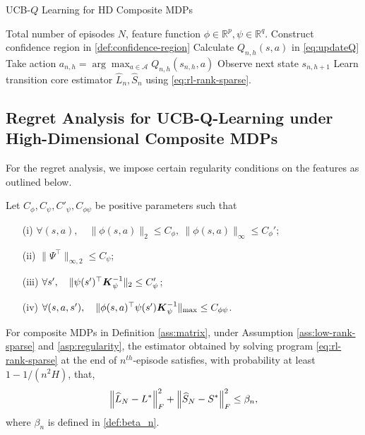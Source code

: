 \begin{algorithm}[tb]
\caption{UCB-$Q$ Learning for HD Composite MDPs}
\label{alg:UCBQL}
\begin{algorithmic}
 Total number of episodes $N$, feature function $\phi\in \mathbb{R}^p, \psi\in \mathbb{R}^q$.
\STATE Construct confidence region in \eqref{def:confidence-region} \STATE Calculate $Q_{n, h}(s, a)$ in \eqref{eq:updateQ}
\STATE Take action $a_{n, h}=\arg \max _{a \in \mathcal{A}} Q_{n, h}\left(s_{n, h}, a\right)$\;
\STATE Observe next state $s_{n, h+1}$ \;
\ENDFOR
\STATE Learn transition core estimator $\hat L_n,\hat S_n$ using \eqref{eq:rl-rank-sparse}.
\ENDFOR
\end{algorithmic}
\end{algorithm}

\subsection{Regret Analysis for UCB-Q-Learning under High-Dimensional Composite MDPs}
For the regret analysis, we impose certain regularity conditions on the features as outlined below.
\begin{assumption}
\label{asp:regularity}
Let $C_\phi,C_\psi,C'_\psi,C_{\phi\psi}$ be positive parameters such that
\begin{enumerate}
\item[(i)] $\forall (s,a),\quad \|\phi(s,a)\|_2\le C_\phi,\ \|\phi(s,a)\|_{\infty}\le C_\phi'$;
\item[(ii)] $\|\Psi^\top\|_{\infty,2}\le C_\psi$;
\item[(iii)] $\forall s',\quad \|\psi(s')^\top \boldsymbol{K}_{\psi}^{-1}\|_2\le C'_\psi$;
\item[(iv)] $\forall (s,a,s'),\quad\|\phi(s,a)^\top \psi(s')\boldsymbol{K}_{\psi}^{-1}\|_{\max}\le C_{\phi\psi}$.
\end{enumerate}
\end{assumption}


\begin{lemma}
\label{lemma:estimation-error-single}
For composite MDPs in Definition \ref{ass:matrix}, under Assumption \ref{ass:low-rank-sparse} and \ref{asp:regularity}, the estimator obtained by solving program \eqref{eq:rl-rank-sparse} at the end of $n^{th}$-episode satisfies, with probability at least $1-1/(n^2H)$, that,
\[\left\lVert\widehat L_N-L^*\right\rVert_F^2+\left\lVert\widehat S_N-S^*\right\rVert_F^2\leq \beta_n,\]
where $\beta_n$ is defined in \eqref{def:beta_n}. 
\end{lemma}

